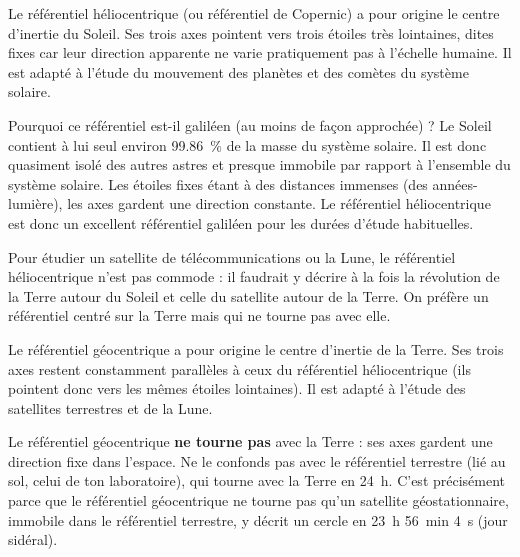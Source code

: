 \documentclass[11pt]{article}
\newcommand{\cle}[1]{{\popxbold\color{popdark}#1}}
\newcounter{popsec}
\newcounter{popsub}
\newcommand{\courssub}[1]{%
  \stepcounter{popsub}%
  \par\vspace{9pt}\noindent{\popxbold\fontsize{11.5}{13}\selectfont\color{popink}{\color{poporange}\thepopsec.\thepopsub}\hspace{6pt}#1}\par\nopagebreak\vspace{4pt}
}
\begin{document}
\begin{definition}
Le \cle{référentiel héliocentrique} (ou référentiel de Copernic) a pour origine le centre d'inertie du Soleil. Ses trois axes pointent vers trois étoiles très lointaines, dites \og fixes \fg{} car leur direction apparente ne varie pratiquement pas à l'échelle humaine. Il est adapté à l'étude du mouvement des planètes et des comètes du système solaire.
\end{definition}

Pourquoi ce référentiel est-il galiléen (au moins de façon approchée) ? Le Soleil contient à lui seul environ \SI{99,86}{\%} de la masse du système solaire. Il est donc quasiment isolé des autres astres et presque immobile par rapport à l'ensemble du système solaire. Les étoiles \og fixes \fg{} étant à des distances immenses (des années-lumière), les axes gardent une direction constante. Le référentiel héliocentrique est donc un excellent référentiel galiléen pour les durées d'étude habituelles.

\courssub{Le référentiel géocentrique}

Pour étudier un satellite de télécommunications ou la Lune, le référentiel héliocentrique n'est pas commode : il faudrait y décrire à la fois la révolution de la Terre autour du Soleil et celle du satellite autour de la Terre. On préfère un référentiel \og centré sur la Terre \fg{} mais qui ne tourne pas avec elle.

\begin{definition}
Le \cle{référentiel géocentrique} a pour origine le centre d'inertie de la Terre. Ses trois axes restent constamment parallèles à ceux du référentiel héliocentrique (ils pointent donc vers les mêmes étoiles lointaines). Il est adapté à l'étude des satellites terrestres et de la Lune.
\end{definition}

\begin{attention}
Le référentiel géocentrique \textbf{ne tourne pas} avec la Terre : ses axes gardent une direction fixe dans l'espace. Ne le confonds pas avec le référentiel terrestre (lié au sol, celui de ton laboratoire), qui tourne avec la Terre en \SI{24}{h}. C'est précisément parce que le référentiel géocentrique ne tourne pas qu'un satellite géostationnaire, immobile dans le référentiel terrestre, y décrit un cercle en \SI{23}{h} \SI{56}{min} \SI{4}{s} (jour sidéral).
\end{attention}
\end{document}
